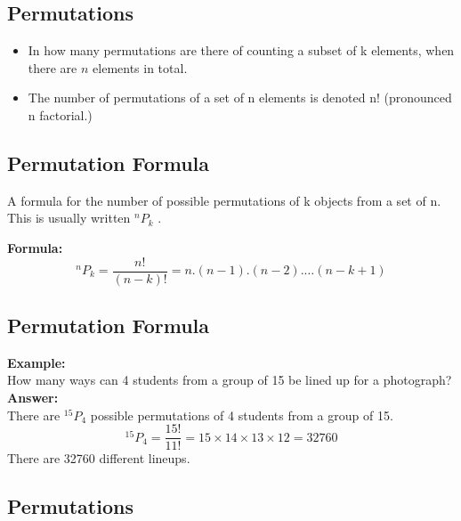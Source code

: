 \documentclass[a4paper,12pt]{article}
\begin{document}

\subsection{Permutations}

\begin{itemize}
\item In how many permutations are there of counting a subset of k elements, when there are $n$ elements in total.

\item The number of permutations of a set of n elements is denoted n! (pronounced n factorial.)
\end{itemize}


\subsection{Permutation Formula}

A formula for the number of possible permutations of k objects from a set of n. This is usually written $^nP_k$ .

\bigskip
\textbf{Formula:}	
\[ ^nP_k = \frac{n!}{(n-k)!} =  n.(n-1).(n-2).\ldots(n-k+1) \]



\subsection{Permutation Formula}

\textbf{Example:}\\	
How many ways can 4 students from a group of 15 be lined up for a photograph?\\
\bigskip
\textbf{Answer:	}\\
There are $^{15}P_4$ possible permutations of 4 students from a group of 15.
\[ ^{15}P_4 = \frac{15!}{11!} = 15\times 14\times 13\times 12 = 32760 \]
There are 32760 different lineups.




\subsection{ Permutations }
\end{document}
